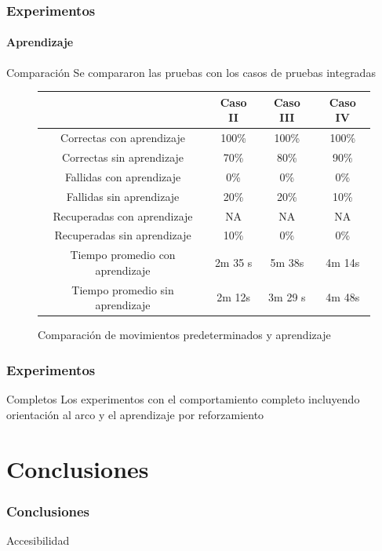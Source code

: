 \documentclass{beamer}
\begin{document}
\begin{frame}
  \frametitle{Experimentos}
  \framesubtitle{Aprendizaje}
  \begin{block}{Comparaci\'on}
	Se compararon las pruebas con los casos de pruebas integradas
\end{block}

\begin{figure}
\centering
\begin{tabular}{|c|c|c|c|}
\hline  & Caso II & Caso III & Caso IV \\ 
\hline 
Correctas con aprendizaje & 100\% & 100\% & 100\% \\ 
\hline 
Correctas sin aprendizaje & 70\% & 80\% & 90\% \\ 
\hline 
Fallidas con aprendizaje & 0\% & 0\% & 0\% \\ 
\hline 
Fallidas sin aprendizaje & 20\% & 20\% & 10\% \\ 
\hline 
Recuperadas con aprendizaje & NA & NA & NA \\ 
\hline 
Recuperadas sin aprendizaje & 10\% & 0\% & 0\% \\ 
\hline 
Tiempo promedio con aprendizaje & 2m 35 s & 5m 38s & 4m 14s \\ 
\hline 
Tiempo promedio sin aprendizaje & 2m 12s & 3m 29 s & 4m 48s \\
\hline
\end{tabular} 
\caption{Comparaci\'on de movimientos predeterminados y aprendizaje}
\label{tabla:comparacion}

\end{figure}

\end{frame}



\begin{frame}
\frametitle{Experimentos}
\begin{block}{Completos}
Los experimentos con el comportamiento completo incluyendo orientaci\'on al arco y el aprendizaje por reforzamiento
\end{block}


\end{frame}

\section{Conclusiones}
\begin{frame}
\frametitle{Conclusiones}
\begin{block}{Accesibilidad}

\end{block}


\end{frame}
\end{document}
